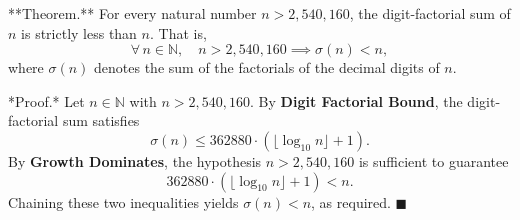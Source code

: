 **Theorem.** For every natural number $n > 2{,}540{,}160$, the digit-factorial sum of $n$ is strictly less than $n$. That is,
$$\forall\, n \in \mathbb{N},\quad n > 2{,}540{,}160 \implies \sigma(n) < n,$$
where $\sigma(n)$ denotes the sum of the factorials of the decimal digits of $n$.

*Proof.* Let $n \in \mathbb{N}$ with $n > 2{,}540{,}160$. By \textbf{Digit Factorial Bound}, the digit-factorial sum satisfies
$$\sigma(n) \leq 362880 \cdot (\lfloor \log_{10} n \rfloor + 1).$$
By \textbf{Growth Dominates}, the hypothesis $n > 2{,}540{,}160$ is sufficient to guarantee
$$362880 \cdot (\lfloor \log_{10} n \rfloor + 1) < n.$$
Chaining these two inequalities yields $\sigma(n) < n$, as required. $\blacksquare$